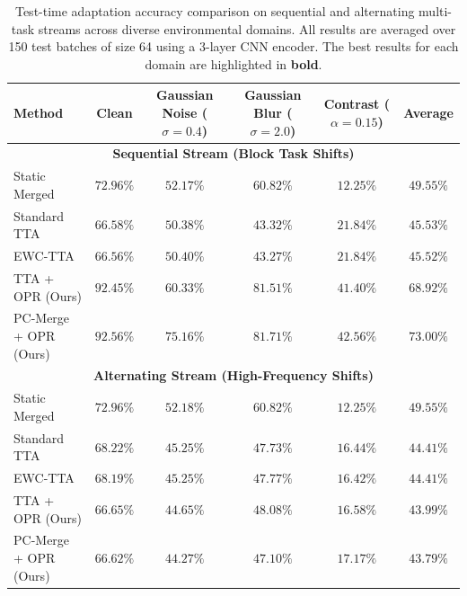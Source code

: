 \documentclass{article}
\theoremstyle{plain}
\theoremstyle{definition}
\theoremstyle{remark}
\begin{document}
\begin{table}[t]
\caption{Test-time adaptation accuracy comparison on sequential and alternating multi-task streams across diverse environmental domains. All results are averaged over 150 test batches of size 64 using a 3-layer CNN encoder. The best results for each domain are highlighted in \textbf{bold}.}
\label{tab:results}
\vskip 0.15in
\begin{center}
\begin{small}
\begin{sc}
\begin{tabular}{lccccc}
\toprule
Method & Clean & Gaussian Noise ($\sigma=0.4$) & Gaussian Blur ($\sigma=2.0$) & Contrast ($\alpha=0.15$) & Average \\
\midrule
\multicolumn{6}{c}{\textbf{Sequential Stream (Block Task Shifts)}} \\
\midrule
Static Merged & $72.96\%$ & $52.17\%$ & $60.82\%$ & $12.25\%$ & $49.55\%$ \\
Standard TTA & $66.58\%$ & $50.38\%$ & $43.32\%$ & $21.84\%$ & $45.53\%$ \\
EWC-TTA & $66.56\%$ & $50.40\%$ & $43.27\%$ & $21.84\%$ & $45.52\%$ \\
TTA + OPR (Ours) & $92.45\%$ & $60.33\%$ & $81.51\%$ & $41.40\%$ & $68.92\%$ \\
PC-Merge + OPR (Ours) & $\mathbf{92.56\%}$ & $\mathbf{75.16\%}$ & $\mathbf{81.71\%}$ & $\mathbf{42.56\%}$ & $\mathbf{73.00\%}$ \\
\midrule
\multicolumn{6}{c}{\textbf{Alternating Stream (High-Frequency Shifts)}} \\
\midrule
Static Merged & $\mathbf{72.96\%}$ & $\mathbf{52.18\%}$ & $\mathbf{60.82\%}$ & $12.25\%$ & $\mathbf{49.55\%}$ \\
Standard TTA & $68.22\%$ & $45.25\%$ & $47.73\%$ & $16.44\%$ & $44.41\%$ \\
EWC-TTA & $68.19\%$ & $45.25\%$ & $47.77\%$ & $16.42\%$ & $44.41\%$ \\
TTA + OPR (Ours) & $66.65\%$ & $44.65\%$ & $48.08\%$ & $16.58\%$ & $43.99\%$ \\
PC-Merge + OPR (Ours) & $66.62\%$ & $44.27\%$ & $47.10\%$ & $\mathbf{17.17\%}$ & $43.79\%$ \\
\bottomrule
\end{tabular}
\end{sc}
\end{small}
\end{center}
\vskip -0.1in
\end{table}
\end{document}
